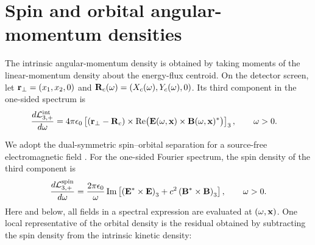 
\section{Spin and orbital angular-momentum densities}

The intrinsic angular-momentum density is obtained by taking moments
of the linear-momentum density about the energy-flux centroid.  On the
detector screen, let ${\bf r}_\perp=(x_1,x_2,0)$ and
${\bf R}_c(\omega)=(X_c(\omega),Y_c(\omega),0)$.  Its third component in the
one-sided spectrum is
\begin{align}
  \frac{d\mathcal L^{\mathrm{int}}_{3,+}}{d\omega}
  &=4\pi\epsilon_0\left[
    ({\bf r}_\perp-{\bf R}_c)\times
    \operatorname{Re}\bigl({\bf E}(\omega,{\bf x})
    \times{\bf B}(\omega,{\bf x})^*\bigr)
  \right]_3,
  \qquad \omega>0.
  \label{eq:one-sided-intrinsic-kinetic-angular-momentum-density}
\end{align}

We adopt the dual-symmetric spin--orbital separation for a source-free
electromagnetic field \cite{bliokh_conservation_2014}.  For the one-sided
Fourier spectrum, the spin density of the third component is
\begin{align}
  \frac{d\mathcal L^{\mathrm{spin}}_{3,+}}{d\omega}
  =\frac{2\pi\epsilon_0}{\omega}\operatorname{Im}\left[
    \left({\bf E}^*\times{\bf E}\right)_3
    +c^2\left({\bf B}^*\times{\bf B}\right)_3
  \right],
  \qquad \omega>0.
  \label{eq:one-sided-spin-angular-momentum-density}
\end{align}
Here and below, all fields in a spectral expression are evaluated at
$(\omega,{\bf x})$.  One local representative of the orbital density is the
residual obtained by subtracting the spin density from the intrinsic kinetic
density:

